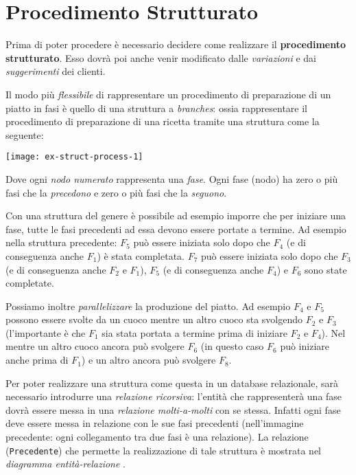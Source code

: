 \section{Procedimento Strutturato}\label{sec:structuredprocess}
Prima di poter procedere è necessario decidere come realizzare il {\bf procedimento strutturato}.
Esso dovrà poi anche venir modificato dalle {\it variazioni} e dai {\it suggerimenti} dei clienti.

Il modo più {\it flessibile} di rappresentare un procedimento di preparazione di un piatto
in fasi è quello di una struttura a {\it branches}: ossia rappresentare il procedimento
di preparazione di una ricetta tramite una struttura come la seguente:

\vspace{5pt}\centerline{\texttt{[image: ex-struct-process-1]}}

\vspace{15pt}

Dove ogni {\it nodo numerato} rappresenta una {\it fase}. Ogni fase (nodo) ha zero o più fasi
che la {\it precedono} e zero o più fasi che la {\it seguono}.

Con una struttura del genere è possibile ad esempio imporre che per iniziare una fase,
tutte le fasi precedenti ad essa devono essere portate a termine. Ad esempio nella struttura precedente:
$F_{5}$ può essere iniziata solo dopo che $F_{4}$ (e di conseguenza anche $F_{1}$) è stata completata.
$F_{7}$ può essere iniziata solo dopo che $F_{3}$ (e di conseguenza anche $F_{2}$ e $F_{1}$),
$F_{5}$ (e di conseguenza anche $F_{4}$) e $F_{6}$ sono state completate.

Possiamo inoltre {\it parallelizzare} la produzione del piatto. Ad esempio $F_{4}$ e $F_{5}$ possono essere
svolte da un cuoco mentre un altro cuoco sta svolgendo $F_{2}$ e $F_{3}$ (l'importante è che
$F_{1}$ sia stata portata a termine prima di iniziare $F_{2}$ e $F_{4}$). Nel mentre un altro
cuoco ancora può svolgere $F_{6}$ (in questo caso $F_{6}$ può iniziare anche prima di $F_{1}$)
e un altro ancora può svolgere $F_{8}$.

Per poter realizzare una struttura come questa in un database relazionale, sarà necessario
introdurre una {\it relazione ricorsiva}: l'entità che rappresenterà una fase dovrà essere
messa in una {\it relazione molti-a-molti} con se stessa. Infatti ogni fase deve essere
messa in relazione con le sue fasi precedenti (nell'immagine precedente: ogni collegamento
tra due fasi è una relazione).
La relazione ({\tt Precedente}) che permette la realizzazione di tale struttura è mostrata
nel {\it diagramma entità-relazione} .

